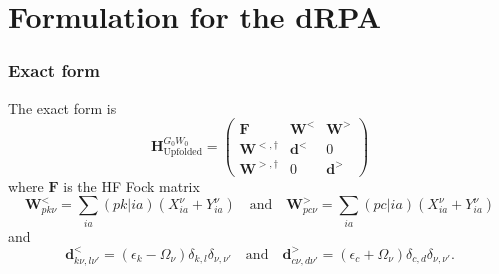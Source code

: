 \section{Formulation for the dRPA}
\subsubsection{Exact form}
The exact form is
\begin{equation}
    \bm{H}_{\text{Upfolded}}^{G_0W_0} = \begin{pmatrix} \bm{F} & \bm{W}^< & \bm{W}^> \\ \bm{W}^{<,\dagger} & \bm{d}^< & 0 \\ \bm{W}^{>, \dagger} & 0 & \bm{d}^> \end{pmatrix}
\label{eq:booth_hamiltonian}
\end{equation}
where $\bm{F}$ is the HF Fock matrix
\begin{equation}
    \bm{W}^<_{pk\nu} = \sum_{ia} (pk|ia) \left( X_{ia}^{\nu} + Y_{ia}^{\nu} \right) \quad \text{and} \quad \bm{W}^>_{pc\nu} = \sum_{ia} (pc|ia) \left( X_{ia}^{\nu} + Y_{ia}^{\nu} \right)
\end{equation}
and 
\begin{equation}
    \bm{d}^<_{k\nu , l\nu'} = \left(\epsilon_k - \Omega_\nu\right) \delta_{k,l} \delta_{\nu,\nu'} \quad \text{and} \quad \bm{d}^>_{c\nu , d\nu'} = \left(\epsilon_c + \Omega_\nu\right) \delta_{c,d} \delta_{\nu,\nu'}.
\end{equation}
